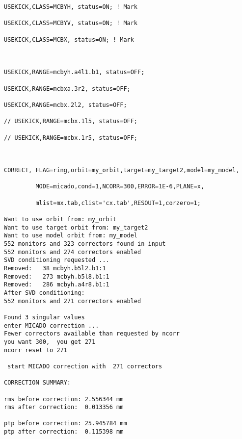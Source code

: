 \begin{verbatim}
USEKICK,CLASS=MCBYH, status=ON; ! Mark

USEKICK,CLASS=MCBYV, status=ON; ! Mark

USEKICK,CLASS=MCBX, status=ON; ! Mark



USEKICK,RANGE=mcbyh.a4l1.b1, status=OFF;

USEKICK,RANGE=mcbxa.3r2, status=OFF;

USEKICK,RANGE=mcbx.2l2, status=OFF;

// USEKICK,RANGE=mcbx.1l5, status=OFF;

// USEKICK,RANGE=mcbx.1r5, status=OFF;



CORRECT, FLAG=ring,orbit=my_orbit,target=my_target2,model=my_model,

         MODE=micado,cond=1,NCORR=300,ERROR=1E-6,PLANE=x,

         mlist=mx.tab,clist='cx.tab',RESOUT=1,corzero=1;

Want to use orbit from: my_orbit
Want to use target orbit from: my_target2
Want to use model orbit from: my_model
552 monitors and 323 correctors found in input
552 monitors and 274 correctors enabled
SVD conditioning requested ...
Removed:   38 mcbyh.b5l2.b1:1
Removed:   273 mcbyh.b5l8.b1:1
Removed:   286 mcbyh.a4r8.b1:1
After SVD conditioning:             
552 monitors and 271 correctors enabled

Found 3 singular values
enter MICADO correction ...
Fewer correctors available than requested by ncorr
you want 300,  you get 271
ncorr reset to 271
  
 start MICADO correction with  271 correctors
  
CORRECTION SUMMARY:   

rms before correction: 2.556344 mm
rms after correction:  0.013356 mm

ptp before correction: 25.945784 mm
ptp after correction:  0.115398 mm


\end{verbatim}
